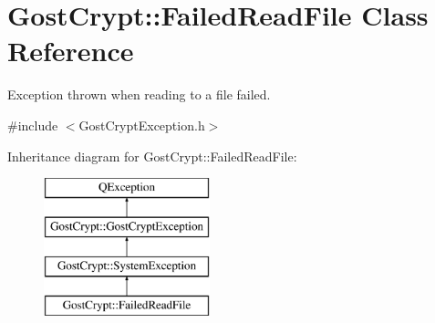 \hypertarget{class_gost_crypt_1_1_failed_read_file}{}\section{Gost\+Crypt\+:\+:Failed\+Read\+File Class Reference}
\label{class_gost_crypt_1_1_failed_read_file}


Exception thrown when reading to a file failed.  




{\ttfamily \#include $<$Gost\+Crypt\+Exception.\+h$>$}

Inheritance diagram for Gost\+Crypt\+:\+:Failed\+Read\+File\+:\begin{figure}[H]
\begin{center}
\leavevmode
\includegraphics[height=4.000000cm]{class_gost_crypt_1_1_failed_read_file}
\end{center}
\end{figure}
